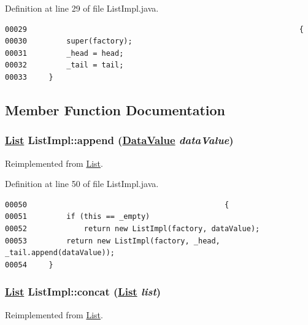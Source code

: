 Definition at line 29 of file List\-Impl.java.\footnotesize\begin{verbatim}00029                                                              {
00030         super(factory);
00031         _head = head;
00032         _tail = tail;
00033     }
\end{verbatim}\normalsize 


\subsection{Member Function Documentation}
\hypertarget{classListImpl_a3}{
\subsubsection[append]{\setlength{\rightskip}{0pt plus 5cm}\hyperlink{interfaceList}{List} List\-Impl::append (\hyperlink{interfaceDataValue}{Data\-Value} {\em data\-Value})}}
\label{classListImpl_a3}




Reimplemented from \hyperlink{interfaceList_a3}{List}.

Definition at line 50 of file List\-Impl.java.\footnotesize\begin{verbatim}00050                                             {
00051         if (this == _empty) 
00052             return new ListImpl(factory, dataValue);
00053         return new ListImpl(factory, _head, _tail.append(dataValue));
00054     }
\end{verbatim}\normalsize 
\hypertarget{classListImpl_a4}{
\subsubsection[concat]{\setlength{\rightskip}{0pt plus 5cm}\hyperlink{interfaceList}{List} List\-Impl::concat (\hyperlink{interfaceList}{List} {\em list})}}
\label{classListImpl_a4}




Reimplemented from \hyperlink{interfaceList_a4}{List}.

